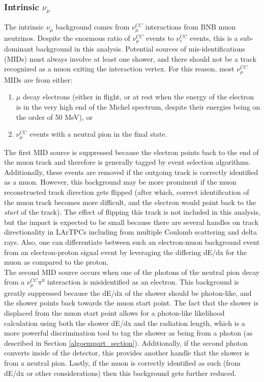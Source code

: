 \subsubsection{Intrinsic $\nu_\mu$}
The intrinsic $\nu_\mu$ background comes from $\nu_\mu^{CC}$ interactions from BNB muon neutrinos. Despite the enormous ratio of $\nu_\mu^{CC}$ events to $\nu_e^{CC}$ events, this is a sub-dominant background in this analysis. Potential sources of mis-identifications (MIDs) must always involve at least one shower, and there should not be a track recognized as a muon exiting the interaction vertex. For this reason, most $\nu_\mu^{CC}$ MIDs are from either:
\begin{enumerate}
\item $\mu$ decay electrons (either in flight, or at rest when the energy of the electron is in the very high end of the Michel spectrum, despite their energies being on the order of 50 MeV), or 
\item $\nu_\mu^{CC}$ events with a neutral pion in the final state. 
\end{enumerate}
The first MID source is suppressed because the electron points back to the end of the muon track and therefore is generally tagged by event selection algorithms. Additionally, these events are removed if the outgoing track is correctly identified as a muon. However, this background may be more prominent if the muon reconstructed track direction gets flipped (after which, correct identification of the muon track becomes more difficult, and the electron would point back to the \textit{start} of the track). The effect of flipping this track is not included in this analysis, but the impact is expected to be small because there are several handles on track directionality in LArTPCs including from multiple Coulomb scattering and delta rays. Also, one can differentiate between such an electron-muon background event from an electron-proton signal event by leveraging the differing dE/dx for the muon as compared to the proton.\\

The second MID source occurs when one of the photons of the neutral pion decay from a $\nu_\mu^{CC}\pi^0$ interaction is misidentified as an electron. This background is greatly suppressed because the dE/dx of the shower should be photon-like, and the shower points back towards the muon start point. The fact that the shower is displaced from the muon start point allows for a photon-like likelihood calculation using both the shower dE/dx and the radiation length, which is a more powerful discrimination tool to tag the shower as being from a photon (as described in Section \ref{algoempart_section}). Additionally, if the second photon converts inside of the detector, this provides another handle that the shower is from a neutral pion. Lastly, if the muon is correctly identified as such (from dE/dx or other considerations) then this background gets further reduced.

